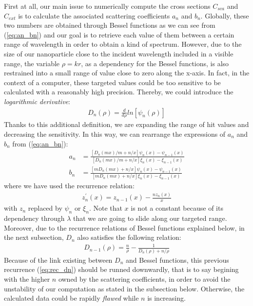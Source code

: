 \documentclass{article}
\numberwithin{equation}{section}
\begin{document}
First at all, our main issue to numerically compute the cross sections $C_{sca}$ and $C_{ext}$ is to calculate the associated scattering coefficients $a_{n}$ and $b_{n}$. Globally, these two numbers are obtained through Bessel functions as we can see from (\ref{eq:an_bn}) and our goal is to retrieve each value of them between a certain range of wavelength in order to obtain a kind of spectrum. However, due to the size of our nanoparticle close to the incident wavelength included in a visible range, the variable $\rho=kr$, as a dependency for the Bessel functions, is also restrained into a small range of value close to zero along the x-axis. In fact, in the context of a computer, these targeted values could be too sensitive to be calculated with a reasonably high precision. Thereby, we could introduce the \textit{logarithmic derivative}:
\begin{align}
D_{n}(\rho)=\frac{d}{d\rho}ln[\psi_{n}(\rho)]
\end{align}
Thanks to this additional definition, we are expanding the range of hit values and decreasing the sensitivity. In this way, we can rearrange the expressions of $a_{n}$ and $b_{n}$ from (\ref{eq:an_bn}):
\begin{equation}
\begin{aligned}
a_{n}&=\frac{[D_{n}(mx)/m + n/x]\psi_{n}(x)-\psi_{n-1}(x)}{[D_{n}(mx)/m + n/x]\xi_{n}(x)-\xi_{n-1}(x)}\\
b_{n}&=\frac{[mD_{n}(mx) + n/x]\psi_{n}(x)-\psi_{n-1}(x)}{[mD_{n}(mx) + n/x]\xi_{n}(x)-\xi_{n-1}(x)}
\end{aligned}
\end{equation}
where we have used the recurrence relation:
\begin{align}
z^{'}_{n}(x)=z_{n-1}(x)-\frac{nz_{n}(x)}{x}
\end{align}
with $z_{n}$ replaced by $\psi_{n}$ or $\xi_{n}$. Note that $x$ is not a constant because of its dependency through $\lambda$ that we are going to slide along our targeted range. Moreover, due to the recurrence relations of Bessel functions explained below, in the next subsection, $D_{n}$ also satisfies the following relation:
\begin{align}\label{eq:rec_dn}
D_{n-1}(\rho)=\frac{n}{\rho}-\frac{1}{D_{n}(\rho)+n/\rho}
\end{align}
Because of the link existing between $D_{n}$ and Bessel functions, this previous recurrence (\ref{eq:rec_dn}) should be runned downwardly, that is to say begining with the higher $n$ owned by the scattering coefficients, in order to avoid the unstability of our computation as stated in the subsection below. Otherwise, the calculated data could be rapidly \textit{flawed} while $n$ is increasing.
\end{document}
